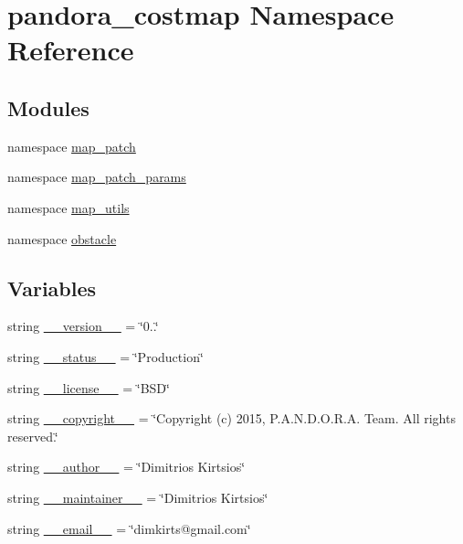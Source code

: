 \hypertarget{namespacepandora__costmap}{\section{pandora\-\_\-costmap \-Namespace \-Reference}
\label{namespacepandora__costmap}
}
\subsection*{\-Modules}
\begin{DoxyCompactItemize}
\item 
namespace \hyperlink{namespacepandora__costmap_1_1map__patch}{map\-\_\-patch}
\item 
namespace \hyperlink{namespacepandora__costmap_1_1map__patch__params}{map\-\_\-patch\-\_\-params}
\item 
namespace \hyperlink{namespacepandora__costmap_1_1map__utils}{map\-\_\-utils}
\item 
namespace \hyperlink{namespacepandora__costmap_1_1obstacle}{obstacle}
\end{DoxyCompactItemize}
\subsection*{\-Variables}
\begin{DoxyCompactItemize}
\item 
string \hyperlink{namespacepandora__costmap_ab656017f795670d90fbe4494172f1ee6}{\-\_\-\-\_\-version\-\_\-\-\_\-} = \char`\"{}0..\char`\"{}
\item 
string \hyperlink{namespacepandora__costmap_a3f743a72f407ca7f4e85bc69da44f99d}{\-\_\-\-\_\-status\-\_\-\-\_\-} = \char`\"{}\-Production\char`\"{}
\item 
string \hyperlink{namespacepandora__costmap_a8031a61b9e8498f517bdb780eb231f48}{\-\_\-\-\_\-license\-\_\-\-\_\-} = \char`\"{}\-B\-S\-D\char`\"{}
\item 
string \hyperlink{namespacepandora__costmap_a59a88d812a6b60bed327762f581ccf8f}{\-\_\-\-\_\-copyright\-\_\-\-\_\-} = \char`\"{}\-Copyright (c) 2015, \-P.\-A.\-N.\-D.\-O.\-R.\-A. \-Team. \-All rights reserved.\char`\"{}
\item 
string \hyperlink{namespacepandora__costmap_a1252595e725e90b7d0652bef71741d77}{\-\_\-\-\_\-author\-\_\-\-\_\-} = \char`\"{}\-Dimitrios \-Kirtsios\char`\"{}
\item 
string \hyperlink{namespacepandora__costmap_afdc7dbab2be0029fcec6c7bc4ad2c3ca}{\-\_\-\-\_\-maintainer\-\_\-\-\_\-} = \char`\"{}\-Dimitrios \-Kirtsios\char`\"{}
\item 
string \hyperlink{namespacepandora__costmap_af0e6ea2ce71fdf21e890483cca0416f4}{\-\_\-\-\_\-email\-\_\-\-\_\-} = \char`\"{}dimkirts@gmail.\-com\char`\"{}
\end{DoxyCompactItemize}


